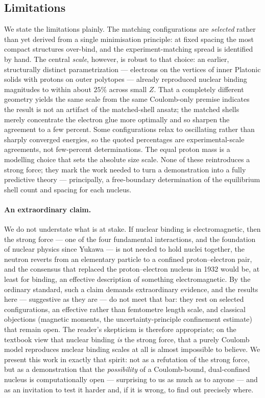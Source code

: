 \documentclass[11pt]{article}
\begin{document}
\subsection{Limitations}
\label{sec:limitations}

We state the limitations plainly. The matching configurations are \emph{selected} rather than
yet derived from a single minimisation principle: at fixed spacing the most compact structures
over-bind, and the experiment-matching spread is identified by hand. The central \emph{scale},
however, is robust to that choice: an earlier, structurally distinct parametrization --- electrons
on the vertices of inner Platonic solids with protons on outer polytopes --- already reproduced
nuclear binding magnitudes to within about $25\%$ across small $Z$. That a completely different
geometry yields the same scale from the same Coulomb-only premise indicates the result is not an
artifact of the matched-shell ansatz; the matched shells merely concentrate the electron glue more
optimally and so sharpen the agreement to a few percent. Some configurations relax
to oscillating rather than sharply converged energies, so the quoted percentages are
experimental-scale agreements, not few-percent determinations. The equal proton mass is a
modelling choice that sets the absolute size scale. None of these reintroduces a strong force;
they mark the work needed to turn a demonstration into a fully predictive theory --- principally,
a free-boundary determination of the equilibrium shell count and spacing for each nucleus.

\paragraph{An extraordinary claim.} We do not understate what is at stake. If nuclear binding is
electromagnetic, then the strong force --- one of the four fundamental interactions, and the
foundation of nuclear physics since Yukawa --- is not needed to hold nuclei together, the neutron
reverts from an elementary particle to a confined proton--electron pair, and the consensus that
replaced the proton--electron nucleus in 1932 would be, at least for binding, an effective
description of something electromagnetic. By the ordinary standard, such a claim demands
extraordinary evidence, and the results here --- suggestive as they are --- do not meet that bar:
they rest on selected configurations, an effective rather than femtometre length scale, and
classical objections (magnetic moments, the uncertainty-principle confinement estimate) that
remain open. The reader's skepticism is therefore appropriate; on the textbook view that nuclear
binding \emph{is} the strong force, that a purely Coulomb model reproduces nuclear binding scales
at all is almost impossible to believe. We present this work in exactly that spirit: not as a
refutation of the strong force, but as a demonstration that the \emph{possibility} of a
Coulomb-bound, dual-confined nucleus is computationally open --- surprising to us as much as to
anyone --- and as an invitation to test it harder and, if it is wrong, to find out precisely where.
\end{document}

